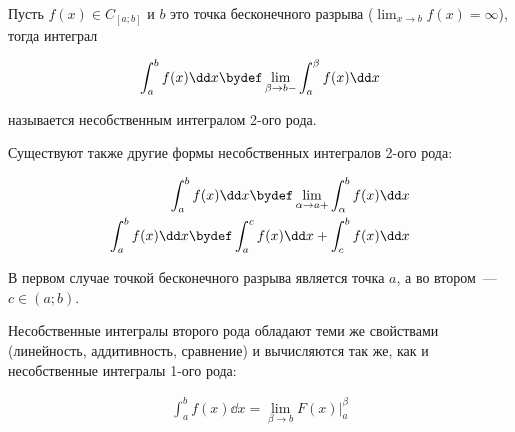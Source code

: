 
\begin{definition}
  Пусть \(f(x) \in C_{[a; b]}\) и \(b\) это точка бесконечного разрыва
  (\(\lim_{x \to b} f(x) = \infty\)), тогда интеграл 

  \begin{align*}
    \int_{a}^{b} f(x) \dd x
    \bydef
    \lim_{\beta \to b-} \int_{a}^{\beta} f(x) \dd x
  \end{align*}

  называется несобственным интегралом 2-ого рода.
\end{definition}

\begin{remark}
  Существуют также другие формы несобственных интегралов 2-ого рода:

  \begin{align*}
    \int_{a}^{b} f(x) \dd x
    \bydef
    \lim_{\alpha \to a+} \int_{\alpha}^{b} f(x) \dd x
    \\
    \int_{a}^{b} f(x) \dd x
    \bydef
    \int_{a}^{c} f(x) \dd x + \int_{c}^{b} f(x) \dd x
  \end{align*}

  В первом случае точкой бесконечного разрыва является точка \(a\), а во 
  втором~--- \(c \in (a; b)\).
\end{remark}

Несобственные интегралы второго рода обладают теми же свойствами (линейность,
аддитивность, сравнение) и вычисляются так же, как и несобственные интегралы
1-ого рода:

\begin{align*}
  \int_{a}^{b} f(x) \dd x = \lim_{\beta \to b} F(x) \bigg\vert_{a}^{\beta}
\end{align*}